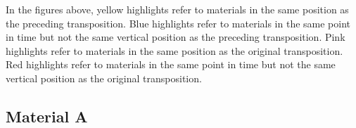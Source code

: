 \begin{table}[H]
    \centering
{}
\caption{Polillas moments part 3}
    \label{fig:p-moments-3}
\end{table}

In the figures above, yellow highlights refer to materials in the same position as the preceding transposition. Blue highlights refer to materials in the same point in time but not the same vertical position as the preceding transposition. Pink highlights refer to materials in the same position as the original transposition. Red highlights refer to materials in the same point in time but not the same vertical position as the original transposition.

\subsection{Material A}

